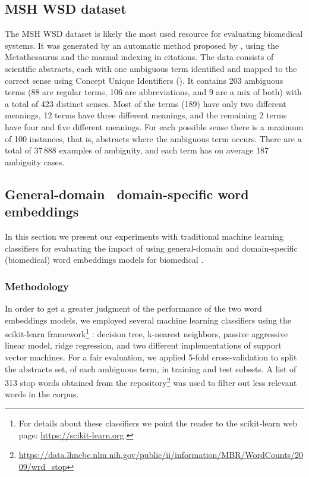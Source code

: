\subsection{MSH WSD dataset}

The MSH WSD dataset is likely the most used resource for evaluating biomedical  systems.
It was generated by an automatic method proposed by \textcite{jimenoyepes2011a}, using the  Metathesaurus and the manual  indexing in  citations.
The data consists of  scientific abstracts, each with one ambiguous term identified and mapped to the correct sense using  Concept Unique Identifiers ().
It contains 203 ambiguous terms (88 are regular terms, 106 are abbreviations, and 9 are a mix of both) with a total of 423 distinct senses.
Most of the terms (189) have only two different meanings, 12 terms have three different meanings, and the remaining 2 terms have four and five different meanings.
For each possible sense there is a maximum of 100 instances, that is, abstracts where the ambiguous term occurs.
There are a total of 37\,888 examples of ambiguity, and each term has on average 187 ambiguity cases.


\subsection{General-domain \versus\ domain-specific word embeddings}
\label{c3:ss:general-vs-specific}

In this section we present our experiments with traditional machine learning classifiers for evaluating the impact of using general-domain and domain-specific (biomedical) word embeddings models for biomedical  \parencite{antunes2016a}.


\subsubsection{Methodology}

In order to get a greater judgment of the performance of the two word embeddings models, we employed several machine learning classifiers using the scikit-learn framework\footnote{For details about these classifiers we point the reader to the scikit-learn web page: \url{https://scikit-learn.org}.} \parencite{pedregosa2011a}: decision tree, k-nearest neighbors, passive aggressive linear model, ridge regression, and two different implementations of support vector machines.
For a fair evaluation, we applied 5-fold cross-validation to split the abstracts set, of each ambiguous term, in training and test subsets.
A list of 313 stop words obtained from the  repository\footnote{\url{https://data.lhncbc.nlm.nih.gov/public/ii/information/MBR/WordCounts/2009/wrd_stop}} was used to filter out less relevant words in the corpus.


